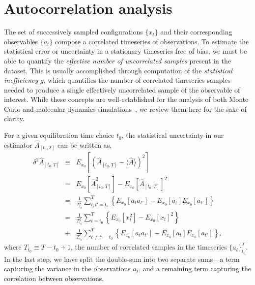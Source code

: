\documentclass[aps,pre,twocolumn,nofootinbib,superscriptaddress,linenumbers,11point]{revtex4-1}
\newcommand{\expect}[1]{\langle #1 \rangle}                %
\newcommand{\estimator}[1]{\hat{#1}}                       %
\begin{document}
\section*{Autocorrelation analysis}
\label{section:statistical-inefficiency}

The set of successively sampled configurations $\{x_t\}$ and their corresponding observables $\{a_t\}$ compose a correlated timeseries of observations.
To estimate the statistical error or uncertainty in a stationary timeseries free of bias, we must be able to quantify the \emph{effective number of uncorrelated samples} present in the dataset.
This is usually accomplished through computation of the \emph{statistical inefficiency} $g$, which quantifies the number of correlated timeseries samples needed to produce a single effectively uncorrelated sample of the observable of interest.
While these concepts are well-established for the analysis of both Monte Carlo and molecular dynamics simulations~\cite{mueller-krumbhaar:j-stat-phys:1973:monte-carlo-analysis,swope:jcp:1982:autocorrelation-analysis,janke:2002:error-analysis,chodera:jctc:2007:wham}, we review them here for the sake of clarity.

For a given equilibration time choice $t_0$, the statistical uncertainty in our estimator $\hat{A}_{[t_0,T]}$ can be written as,
\begin{eqnarray}
\delta^2 \estimator{A}_{[t_0,T]} &\equiv& E_{x_0}\left[\left(\hat{A}_{[t_0,T]} - \expect{\estimator{A}}\right)^2\right] \nonumber \\
&=& E_{x_0}\left[ \hat{A}_{[t_0,T]} ^2 \right] - E_{x_0}\left[ \hat{A}_{[t_0,T]}  \right]^2 \nonumber \\
&=& \frac{1}{T_{t_0}^2} \sum_{t,t'=t_0}^T \left\{ E_{x_0}\left[a_t a_{t'}\right] - E_{x_0}\left[a_t\right] E_{x_0}\left[a_{t'}\right] \right\} \nonumber \\
&=& \frac{1}{T_{t_0}^2} \sum_{t=t_0}^T \left\{ E_{x_0}\left[x_t^2\right] - E_{x_0}\left[x_t\right]^2 \right\} \\
\mbox{} &+& \frac{1}{T_{t_0}^2} \sum_{t\ne t' = t_0}^T \left\{ E_{x_0}\left[a_t a_{t'}\right] - E_{x_0}\left[a_t\right] E_{x_0}\left[a_{t'}\right] \right\} \nonumber ,
\end{eqnarray}
where $T_{t_0} \equiv T - t_0 + 1$, the number of correlated samples in the timeseries $\{a_t\}_{t_0}^T$.
In the last step, we have split the double-sum into two separate sums---a term capturing the variance in the observations $a_t$, and a remaining term capturing the correlation between observations. 
\end{document}
